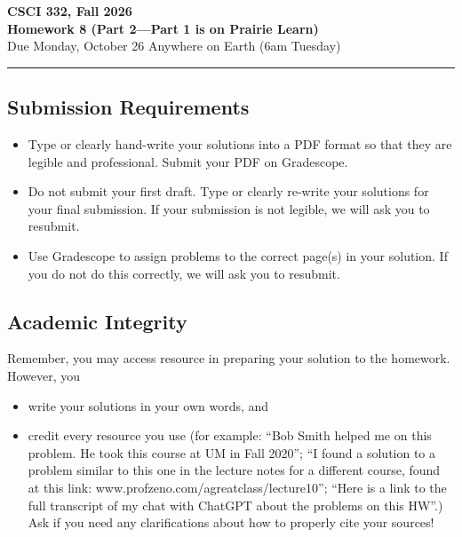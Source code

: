 \documentclass[11pt]{article}
\begin{document}
\begin{center}
\Large\textbf{CSCI 332, Fall 2026}%
\\
\LARGE\textbf{Homework 8 (Part 2---Part 1 is on Prairie Learn)}%
\\[0.5ex]
\large Due Monday, October 26 Anywhere on Earth (6am Tuesday)
\end{center}

\bigskip
\hrule
\bigskip

\subsection*{Submission Requirements}
\begin{itemize}
    \item Type or clearly hand-write your solutions into a PDF format so that they are legible and professional. Submit your PDF on Gradescope. 
    \item Do not submit your first draft. Type or clearly re-write your solutions for your final submission. If your submission is not legible, we will ask you to resubmit.
    \item Use Gradescope to assign problems to the correct page(s) in your solution. If you do not do this correctly, we will ask you to resubmit.
\end{itemize}

\subsection*{Academic Integrity}

Remember, you may access  resource in preparing your solution to the homework. However, you 
\begin{itemize}
    \item write your solutions in your own words, and
    \item credit every resource you use (for example: ``Bob Smith helped me on
    this problem. He took this course at UM in Fall 2020''; ``I found a solution
    to a problem similar to this one in the lecture notes for a different
    course, found at this link: www.profzeno.com/agreatclass/lecture10''; ``Here is a link to the full transcript of my chat with ChatGPT about the problems on this HW''.)
    Ask if you need any clarifications about how to properly cite your sources!
\end{itemize}




\newpage
    
\end{document}
